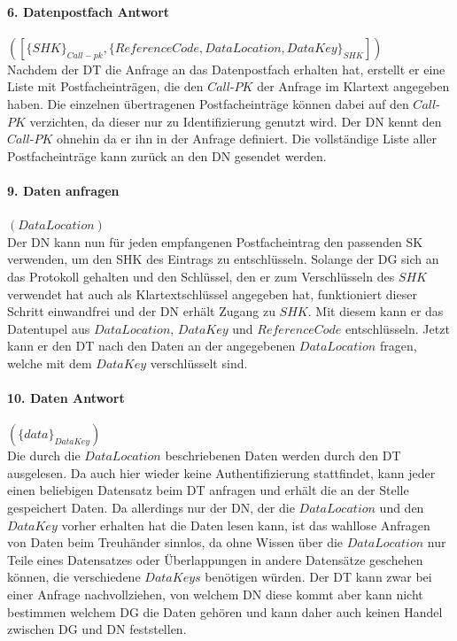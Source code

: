 \documentclass[
	fontsize=11pt,
	headings=small,
	parskip=half,           %
	bibliography=totoc,
	numbers=noenddot,       %
	open=any,               %
]{scrreprt}
\begin{document}
\paragraph{6. Datenpostfach Antwort} $([\{SHK\}_{Call-pk}, \{ReferenceCode, DataLocation, DataKey\}_{SHK}])$\\
Nachdem der DT die Anfrage an das Datenpostfach erhalten hat, erstellt er eine Liste mit Postfacheinträgen, die den $Call$-$PK$ der Anfrage im Klartext angegeben haben. Die einzelnen übertragenen Postfacheinträge können dabei auf den $Call$-$PK$ verzichten, da dieser nur zu Identifizierung genutzt wird. Der DN kennt den $Call$-$PK$ ohnehin da er ihn in der Anfrage definiert. Die vollständige Liste aller Postfacheinträge kann zurück an den DN gesendet werden.

\paragraph{9. Daten anfragen} $(DataLocation)$\\
Der DN kann nun für jeden empfangenen Postfacheintrag den passenden SK verwenden, um den SHK des Eintrags zu entschlüsseln. Solange der DG sich an das Protokoll gehalten und den Schlüssel, den er zum Verschlüsseln des $SHK$ verwendet hat auch als Klartextschlüssel angegeben hat, funktioniert dieser Schritt einwandfrei und der DN erhält Zugang zu $SHK$. Mit diesem kann er das Datentupel aus $DataLocation$, $DataKey$ und $ReferenceCode$ entschlüsseln. Jetzt kann er den DT nach den Daten an der angegebenen $DataLocation$ fragen, welche mit dem $DataKey$ verschlüsselt sind.

\paragraph{10. Daten Antwort} $(\{data\}_{DataKey})$\\
Die durch die $DataLocation$ beschriebenen Daten werden durch den DT ausgelesen. Da auch hier wieder keine Authentifizierung stattfindet, kann jeder einen beliebigen Datensatz beim DT anfragen und erhält die an der Stelle gespeichert Daten. Da allerdings nur der DN, der die $DataLocation$ und den $DataKey$ vorher erhalten hat die Daten lesen kann, ist das wahllose Anfragen von Daten beim Treuhänder sinnlos, da ohne Wissen über die $DataLocation$ nur Teile eines Datensatzes oder Überlappungen in andere Datensätze geschehen können, die verschiedene $DataKeys$ benötigen würden. Der DT kann zwar bei einer Anfrage nachvollziehen, von welchem DN diese kommt aber kann nicht bestimmen welchem DG die Daten gehören und kann daher auch keinen Handel zwischen DG und DN feststellen.
\end{document}
